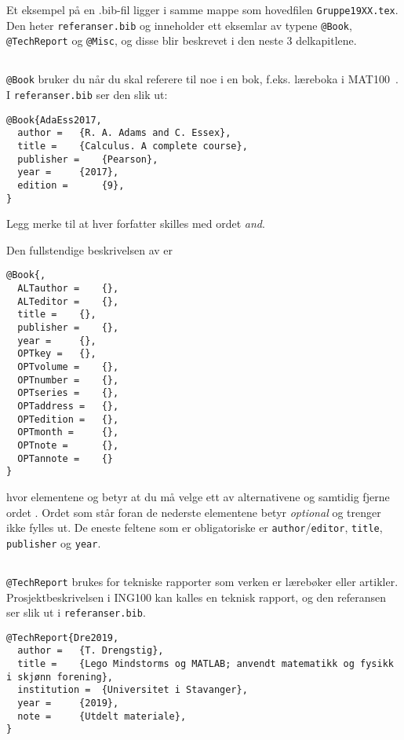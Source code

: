 Et eksempel på en .bib-fil ligger i
samme mappe som hovedfilen {\tt Gruppe19XX.tex}.
Den heter {\tt referanser.bib} og inneholder ett eksemlar av typene
{\tt @Book},   {\tt @TechReport} og {\tt @Misc}, og disse blir beskrevet
i den neste 3 delkapitlene.


\subsection{}
{\tt @Book}  bruker du når du skal referere til noe i en bok,
f.eks. læreboka i MAT100~\cite{AdaEss2017}. I {\tt referanser.bib} ser den slik ut:


\begin{boxedminipage}{\textwidth}
\begin{verbatim}
@Book{AdaEss2017,
  author = 	 {R. A. Adams and C. Essex},
  title = 	 {Calculus. A complete course},
  publisher = 	 {Pearson},
  year = 	 {2017},
  edition = 	 {9},
}
\end{verbatim}
\end{boxedminipage}

Legg merke til at hver forfatter skilles med ordet {\em and}.

Den fullstendige beskrivelsen av  er

\begin{verbatim}
@Book{,
  ALTauthor = 	 {},
  ALTeditor = 	 {},
  title = 	 {},
  publisher = 	 {},
  year = 	 {},
  OPTkey = 	 {},
  OPTvolume = 	 {},
  OPTnumber = 	 {},
  OPTseries = 	 {},
  OPTaddress = 	 {},
  OPTedition = 	 {},
  OPTmonth = 	 {},
  OPTnote = 	 {},
  OPTannote = 	 {}
}
\end{verbatim}
hvor elementene   og  betyr at du må
velge ett 
av alternativene og samtidig fjerne ordet . Ordet
 som står foran de nederste elementene betyr {\em
  optional} og trenger ikke fylles ut. De eneste feltene som er
obligatoriske er {\tt author}/{\tt editor}, {\tt title}, {\tt publisher} og {\tt year}.


\subsection{}
{\tt @TechReport} brukes for tekniske rapporter som verken er
lærebøker eller artikler. Prosjektbeskrivelsen i ING100 kan kalles en
teknisk rapport, og den referansen ser slik ut i {\tt referanser.bib}.

\begin{boxedminipage}{200mm}
\begin{verbatim}
@TechReport{Dre2019,
  author = 	 {T. Drengstig},
  title = 	 {Lego Mindstorms og MATLAB; anvendt matematikk og fysikk i skjønn forening},
  institution =  {Universitet i Stavanger},
  year = 	 {2019},
  note = 	 {Utdelt materiale},
}
\end{verbatim}
\end{boxedminipage}

